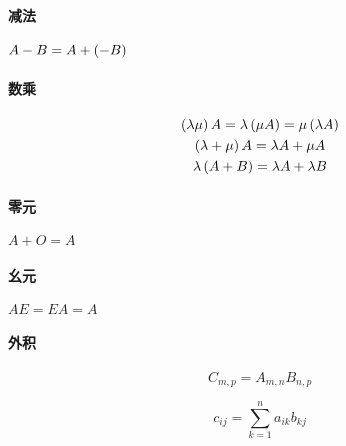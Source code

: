 \documentclass{article}
\begin{document}
\paragraph{减法}$A-B=A+\left(-B\right)$

\paragraph{数乘}

\[\begin{gathered}
        \left(\lambda\mu\right)A=\lambda\left(\mu A\right)=\mu\left(\lambda A\right)\\
        \left(\lambda+\mu\right)A=\lambda A+\mu A\\
        \lambda\left(A+B\right)=\lambda A+\lambda B
    \end{gathered}\]

\paragraph{零元}$A+O=A$

\paragraph{幺元}$AE=EA=A$

\paragraph{外积}

\[C_{m,p}=A_{m,n}B_{n,p}\]

\[c_{ij}=\sum_{k=1}^na_{ik}b_{kj}\]
\end{document}

